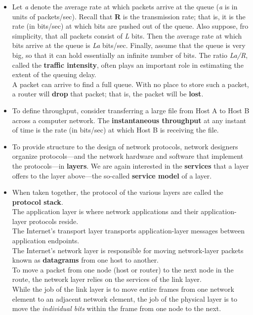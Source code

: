 \begin{itemize}
\item Let \textit{a} denote the average rate at which packets arrive at the queue (\textit{a} is in units of packets/sec). Recall that \textbf{R} is the transmission rate; that is, it is the rate (in bits/sec) at which bits are pushed out of the queue. Also suppose, fro simplicity, that all packets consist of \textit{L} bits. Then the average rate at which bits arrive at the queue is \textit{La} bits/sec. Finally, assume that the queue is very big, so that it can hold essentially an infinite number of bits. The ratio \textit{La/R}, called the \textbf{traffic intensity}, often plays an important role in estimating the extent of the queuing delay.\\A packet can arrive to find a full queue. With no place to store such a packet, a router will \textbf{drop} that packet; that is, the packet will be \textbf{lost}.

\item To define throughput, consider transferring a large file from Host A to Host B across a computer network. The \textbf{instantaneous throughput} at any instant of time is the rate (in bits/sec) at which Host B is receiving the file.

\item To provide structure to the design of network protocols, network designers organize protocols---and the network hardware and software that implement the protocols---in \textbf{layers}. We are again interested in the \textbf{services} that a layer offers to the layer above---the so-called \textbf{service model} of a layer.

\item When taken together, the protocol of the various layers are called the \textbf{protocol stack}.\\The application layer is where network applications and their application-layer protocols reside.\\The Internet's transport layer transports application-layer messages between application endpoints.\\The Internet's network layer is responsible for moving network-layer packets known as \textbf{datagrams} from one host to another.\\To move a packet from one node (host or router) to the next node in the route, the network layer relies on the services of the link layer.\\While the job of the link layer is to move entire frames from one network element to an adjacent network element, the job of the physical layer is to move the \textit{individual bits} within the frame from one node to the next.


\end{itemize}
